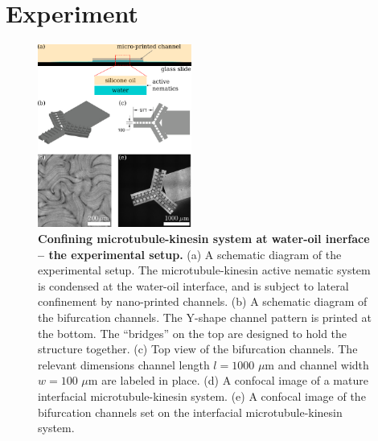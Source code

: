 \documentclass[%
10pt,
superscriptaddress,
twocolumn,
 amsmath,amssymb,
 aps,prx,
]{revtex4-2}
\begin{document}
\section{Experiment}

\begin{figure}[!h]
    \includegraphics[width=0.45\textwidth]{2-bifurcation-experiment}
    \caption{
    \textbf{Confining microtubule-kinesin system at water-oil inerface -- the experimental setup.}
    (a) A schematic diagram of the experimental setup. 
    The microtubule-kinesin active nematic system is condensed at the water-oil interface, and is subject to lateral confinement by nano-printed channels. 
    (b) A schematic diagram of the bifurcation channels. 
    The Y-shape channel pattern is printed at the bottom.
    The ``bridges'' on the top are designed to hold the structure together. 
    (c) Top view of the bifurcation channels. 
    The relevant dimensions channel length $l=1000$ $\mu$m and channel width $w=100$ $\mu$m are labeled in place. 
    (d) A confocal image of a mature interfacial microtubule-kinesin system. 
    (e) A confocal image of the bifurcation channels set on the interfacial microtubule-kinesin system. 
    }
    \label{fig:bifurcation-experiment}
\end{figure}
\end{document}
